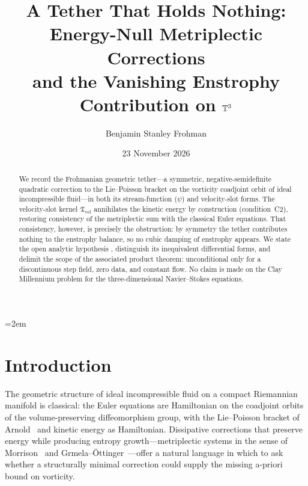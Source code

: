 \documentclass[11pt,reqno]{amsart}
\title[A Tether That Holds Nothing]{%
  A Tether That Holds Nothing:\\
  Energy-Null Metriplectic Corrections\\
  and the Vanishing Enstrophy Contribution on $\mathbb{T}^3$}
\author{Benjamin Stanley Frohman}
\date{23 November 2026}
\theoremstyle{plain}
\theoremstyle{definition}
\theoremstyle{remark}
\newcommand{\Tvel}{\mathfrak{T}_{\mathrm{vel}}}
\newcommand{\Lean}[1]{\texttt{\detokenize{#1}}}
\begin{document}
\emergencystretch=2em
\begin{abstract}
We record the Frohmanian geometric tether---a symmetric, negative-semidefinite
quadratic correction to the Lie--Poisson bracket on the vorticity coadjoint
orbit of ideal incompressible fluid---in both its stream-function ($\psi$) and
velocity-slot forms. The velocity-slot kernel $\Tvel$ annihilates the kinetic
energy by construction (condition~C2), restoring consistency of the metriplectic
sum with the classical Euler equations. That consistency, however, is precisely
the obstruction: by symmetry the tether contributes nothing to the enstrophy
balance, so no cubic damping of enstrophy appears. We state the open analytic
hypothesis \Lean{FrohmanianTetherRate}, distinguish its inequivalent differential
forms, and delimit the scope of the associated product theorem: unconditional
only for a discontinuous step field, zero data, and constant flow. No claim is
made on the Clay Millennium problem for the three-dimensional Navier--Stokes
equations.
\end{abstract}

\maketitle

\section{Introduction}\label{sec:intro}

The geometric structure of ideal incompressible fluid on a compact Riemannian
manifold is classical: the Euler equations are Hamiltonian on the coadjoint
orbits of the volume-preserving diffeomorphism group, with the Lie--Poisson
bracket of Arnold~\cite{Arnold1966,ArnoldKhesin} and kinetic energy as
Hamiltonian. Dissipative corrections that preserve energy while producing
entropy growth---metriplectic systems in the sense of
Morrison~\cite{Morrison1986} and Grmela--\"{O}ttinger~\cite{GrmelaOttinger1997}---offer
a natural language in which to ask whether a structurally minimal correction
could supply the missing a-priori bound on vorticity.
\end{document}
